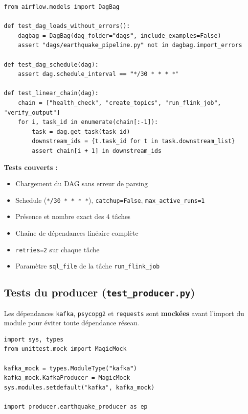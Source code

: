 \documentclass[12pt,a4paper]{article}
\begin{document}
\begin{lstlisting}[style=python, caption={Exemple de test de structure du DAG}]
from airflow.models import DagBag

def test_dag_loads_without_errors():
    dagbag = DagBag(dag_folder="dags", include_examples=False)
    assert "dags/earthquake_pipeline.py" not in dagbag.import_errors

def test_dag_schedule(dag):
    assert dag.schedule_interval == "*/30 * * * *"

def test_linear_chain(dag):
    chain = ["health_check", "create_topics", "run_flink_job", "verify_output"]
    for i, task_id in enumerate(chain[:-1]):
        task = dag.get_task(task_id)
        downstream_ids = {t.task_id for t in task.downstream_list}
        assert chain[i + 1] in downstream_ids
\end{lstlisting}

\textbf{Tests couverts :}
\begin{itemize}
  \item Chargement du DAG sans erreur de parsing
  \item Schedule (\texttt{*/30 * * * *}), \texttt{catchup=False}, \texttt{max\_active\_runs=1}
  \item Présence et nombre exact des 4 tâches
  \item Chaîne de dépendances linéaire complète
  \item \texttt{retries=2} sur chaque tâche
  \item Paramètre \texttt{sql\_file} de la tâche \texttt{run\_flink\_job}
\end{itemize}

\subsection{Tests du producer (\texttt{test\_producer.py})}

Les dépendances \texttt{kafka}, \texttt{psycopg2} et \texttt{requests} sont
\textbf{mockées} avant l'import du module pour éviter toute dépendance réseau.

\begin{lstlisting}[style=python, caption={Mock des dépendances externes}]
import sys, types
from unittest.mock import MagicMock

kafka_mock = types.ModuleType("kafka")
kafka_mock.KafkaProducer = MagicMock
sys.modules.setdefault("kafka", kafka_mock)

import producer.earthquake_producer as ep
\end{lstlisting}
\end{document}
